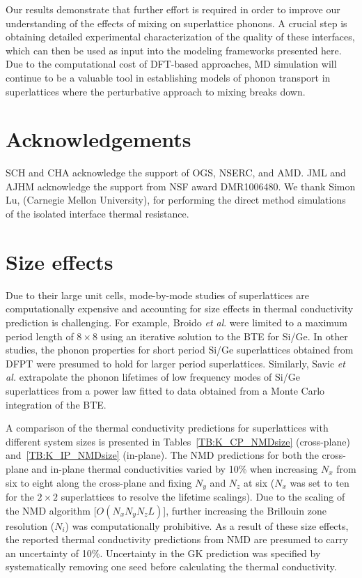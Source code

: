\documentclass[aps,prb,preprint,preprintnumbers,amsmath,amssymb,floatfix,superscriptaddress]{revtex4}
\begin{document}
Our results demonstrate that further effort is required in order to improve our understanding of the effects of mixing on superlattice phonons. A crucial step is obtaining detailed experimental characterization of the quality of these interfaces, which can then be used as input into the modeling frameworks presented here. Due to the computational cost of DFT-based approaches, MD simulation will continue to be a valuable tool in establishing models of phonon transport in superlattices where the perturbative approach to mixing breaks down.

\section{Acknowledgements}
SCH and CHA acknowledge the support of OGS, NSERC, and AMD. JML and AJHM acknowledge the support from NSF award DMR1006480. We thank Simon Lu, (Carnegie Mellon University), for performing the direct method simulations of the isolated interface thermal resistance.

\newpage
\appendix
\section{Size effects}\label{app:size effects}
Due to their large unit cells, mode-by-mode studies of superlattices are computationally expensive and accounting for size effects in thermal conductivity prediction is challenging. For example, Broido \textit{et al}. were limited to a maximum period length of $8\times 8$ using an iterative solution to the BTE for Si/Ge.\cite {PhysRevB.70.081310} In other studies, the phonon properties for short period Si/Ge superlattices obtained from DFPT were presumed to hold for larger period superlattices.\cite{Luckyanova16112012, doi:10.1021/nl202186y} Similarly, Savic \textit{et al.} extrapolate the phonon lifetimes of low frequency modes of Si/Ge superlattices from a power law fitted to data obtained from a Monte Carlo integration of the BTE.\cite{savic:073113} 

A comparison of the thermal conductivity predictions for superlattices with different system sizes is presented in Tables~\ref{TB:K_CP_NMDsize} (cross-plane) and~\ref{TB:K_IP_NMDsize} (in-plane). The NMD predictions for both the cross-plane and in-plane thermal conductivities varied by 10\% when increasing $N_x$ from six to eight along the cross-plane and fixing $N_y$ and $N_z$ at six ($N_x$ was set to ten for the $2\times2$ superlattices to resolve the lifetime scalings). Due to the scaling of the NMD algorithm [$O(N_xN_yN_z L)$], further increasing the Brillouin zone resolution ($N_i$) was computationally prohibitive. As a result of these size effects, the reported thermal conductivity predictions from NMD are presumed to carry an uncertainty of 10\%. Uncertainty in the GK prediction was specified by systematically removing one seed before calculating the thermal conductivity.
\end{document}
